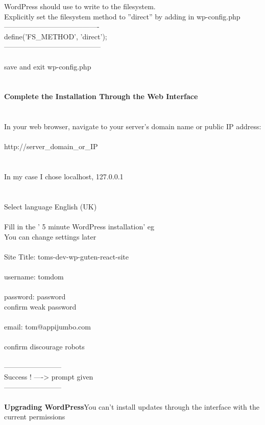 \documentclass[10pt,a4paper]{article}
\begin{document}
{{{{{{{{{{{{{{{{{{{{WordPress should use to write to the filesystem. \\
Explicitly set the filesystem method to ''direct'' by adding in wp-config.php\\
----------------------------------------\\
define('FS\_METHOD', 'direct');\\
-----------------------------------------\\
\\
save and exit wp-config.php\\
\\
\\
\textbf{Complete the Installation Through the Web Interface}}{\large \\
\\
\\
In your web browser, navigate to your server's domain name or public IP address:\\
\\
http://server\_domain\_or\_IP}{\large \\
\\
\\
In my case I chose localhost,  127.0.0.1\\
\\
\\
Select language  English (UK)\\
\\
Fill in the ' 5 minute WordPress installation' eg \\
You can change settings later\\
\\
Site Title:  toms-dev-wp-guten-react-site\\
\\
username: tomdom\\
\\
password: password\\
confirm weak password\\
\\
email: tom@appijumbo.com}{\large \\
\\
confirm discourage robots\\
\\
------------------------\\
Success ! ---->  prompt given\\
------------------------\\
\\
\textbf{Upgrading WordPress}}{\large You can't install updates through the interface with the current permissions}{\large \\
}}}}}}}}}}}}}}}}}}}}
\end{document}
